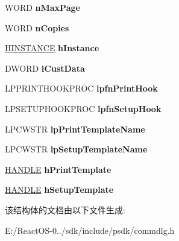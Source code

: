 \begin{DoxyCompactItemize}
W\+O\+RD {\bfseries n\+Max\+Page}
\item 
\mbox{\label{structtag_p_d_w_ad5b4a5b601b1b7cddf78ea763357a482}} 
W\+O\+RD {\bfseries n\+Copies}
\item 
\mbox{\label{structtag_p_d_w_a540db67ae6513be8e00783bba6357a66}} 
\hyperlink{interfacevoid}{H\+I\+N\+S\+T\+A\+N\+CE} {\bfseries h\+Instance}
\item 
\mbox{\label{structtag_p_d_w_a89e97ba20804b517ad2b3a20514bdece}} 
D\+W\+O\+RD {\bfseries l\+Cust\+Data}
\item 
\mbox{\label{structtag_p_d_w_a0d962e9a99983f34c2d1388fb2638fa5}} 
L\+P\+P\+R\+I\+N\+T\+H\+O\+O\+K\+P\+R\+OC {\bfseries lpfn\+Print\+Hook}
\item 
\mbox{\label{structtag_p_d_w_a386b0c884dd3c593f2701ae1ba56ec40}} 
L\+P\+S\+E\+T\+U\+P\+H\+O\+O\+K\+P\+R\+OC {\bfseries lpfn\+Setup\+Hook}
\item 
\mbox{\label{structtag_p_d_w_a3932b494c5bb7fa3c7515a322123de9d}} 
L\+P\+C\+W\+S\+TR {\bfseries lp\+Print\+Template\+Name}
\item 
\mbox{\label{structtag_p_d_w_a7b592c296b0c253f4008df3a67fe3d25}} 
L\+P\+C\+W\+S\+TR {\bfseries lp\+Setup\+Template\+Name}
\item 
\mbox{\label{structtag_p_d_w_aa1aca84d2d86e526a6ff568aec10e5ac}} 
\hyperlink{interfacevoid}{H\+A\+N\+D\+LE} {\bfseries h\+Print\+Template}
\item 
\mbox{\label{structtag_p_d_w_af0609f579bacf4ec5676eb6002e56ad5}} 
\hyperlink{interfacevoid}{H\+A\+N\+D\+LE} {\bfseries h\+Setup\+Template}
\end{DoxyCompactItemize}


该结构体的文档由以下文件生成\+:\begin{DoxyCompactItemize}
\item 
E\+:/\+React\+O\+S-\/0../sdk/include/psdk/commdlg.\+h\end{DoxyCompactItemize}
